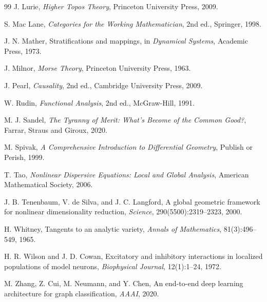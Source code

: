 \documentclass[12pt, a4paper]{article}
\theoremstyle{rsvpstyle}
\theoremstyle{definition}
\begin{document}
\begin{thebibliography}{99}
J. Lurie, \textit{Higher Topos Theory}, Princeton University Press, 2009.

S. Mac Lane, \textit{Categories for the Working Mathematician}, 2nd ed., Springer, 1998.

J. N. Mather, Stratifications and mappings,
in \textit{Dynamical Systems}, Academic Press, 1973.

J. Milnor, \textit{Morse Theory}, Princeton University Press, 1963.

J. Pearl, \textit{Causality}, 2nd ed., Cambridge University Press, 2009.

W. Rudin, \textit{Functional Analysis}, 2nd ed., McGraw-Hill, 1991.

M. J. Sandel, \textit{The Tyranny of Merit: What's Become of the Common Good?},
Farrar, Straus and Giroux, 2020.

M. Spivak, \textit{A Comprehensive Introduction to Differential Geometry},
Publish or Perish, 1999.

T. Tao, \textit{Nonlinear Dispersive Equations: Local and Global Analysis},
American Mathematical Society, 2006.

J. B. Tenenbaum, V. de Silva, and J. C. Langford,
A global geometric framework for nonlinear dimensionality reduction,
\textit{Science}, 290(5500):2319--2323, 2000.

H. Whitney, Tangents to an analytic variety,
\textit{Annals of Mathematics}, 81(3):496--549, 1965.

H. R. Wilson and J. D. Cowan,
Excitatory and inhibitory interactions in localized populations of model neurons,
\textit{Biophysical Journal}, 12(1):1--24, 1972.

M. Zhang, Z. Cui, M. Neumann, and Y. Chen,
An end-to-end deep learning architecture for graph classification,
\textit{AAAI}, 2020.

\end{thebibliography}
\end{document}
